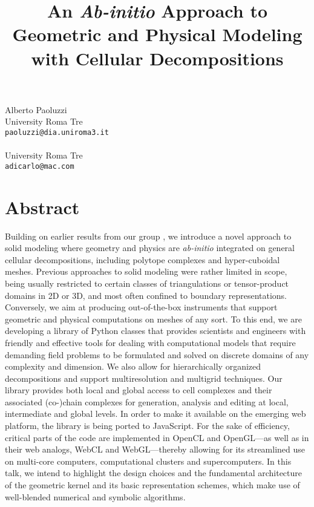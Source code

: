 \title{An \emph{Ab-initio} Approach to Geometric and Physical Modeling with Cellular Decompositions}
 \author{} \institute{}
\maketitle
\begin{center}
{\large Alberto Paoluzzi}\\
University Roma Tre\\
{\tt paoluzzi@dia.uniroma3.it}
\\ \\
University Roma Tre\\
{\tt adicarlo@mac.com}

\end{center}

\section*{Abstract}

Building on earlier results from our group \cite{AP&93,AP03,GS&08,adc&092,adc&09a2}, we introduce a novel approach to solid modeling where geometry and physics are \emph{ab-initio} integrated on general cellular decompositions, including polytope complexes and hyper-cuboidal meshes. Previous approaches to solid modeling were rather limited in scope, being usually restricted to certain classes of triangulations or tensor-product domains in 2D or 3D, and most often confined to boundary representations. Conversely, we aim at producing out-of-the-box instruments that support geometric and physical computations on meshes of any sort. To this end, we are developing a library of Python classes that provides scientists and engineers with friendly and effective tools for dealing with computational models that require demanding field problems to be formulated and solved on discrete domains of any complexity and dimension. We also allow for hierarchically organized decompositions and support multiresolution and multigrid techniques. Our library provides both local and global access to cell complexes and their associated (co-)chain complexes for generation, analysis and editing at local, intermediate and global levels. In order to make it available on the emerging web platform, the library is being ported to JavaScript. For the sake of efficiency, critical parts of the code are implemented in OpenCL and OpenGL---as well as in their web analogs, WebCL and WebGL---thereby allowing for its streamlined use on multi-core computers, computational clusters and supercomputers. In this talk, we intend to highlight the design choices and the fundamental architecture of the geometric kernel and its basic representation schemes, which make use of well-blended numerical and symbolic algorithms.

